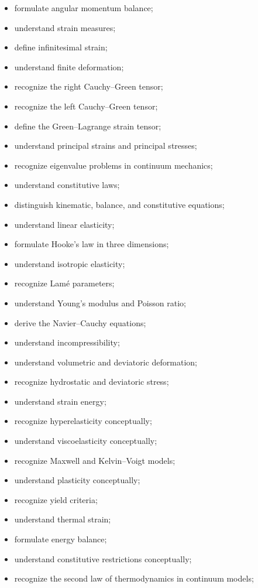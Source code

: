 {\begin{itemize}
    \item formulate angular momentum balance;
    \item understand strain measures;
    \item define infinitesimal strain;
    \item understand finite deformation;
    \item recognize the right Cauchy--Green tensor;
    \item recognize the left Cauchy--Green tensor;
    \item define the Green--Lagrange strain tensor;
    \item understand principal strains and principal stresses;
    \item recognize eigenvalue problems in continuum mechanics;
    \item understand constitutive laws;
    \item distinguish kinematic, balance, and constitutive equations;
    \item understand linear elasticity;
    \item formulate Hooke's law in three dimensions;
    \item understand isotropic elasticity;
    \item recognize Lamé parameters;
    \item understand Young's modulus and Poisson ratio;
    \item derive the Navier--Cauchy equations;
    \item understand incompressibility;
    \item understand volumetric and deviatoric deformation;
    \item recognize hydrostatic and deviatoric stress;
    \item understand strain energy;
    \item recognize hyperelasticity conceptually;
    \item understand viscoelasticity conceptually;
    \item recognize Maxwell and Kelvin--Voigt models;
    \item understand plasticity conceptually;
    \item recognize yield criteria;
    \item understand thermal strain;
    \item formulate energy balance;
    \item understand constitutive restrictions conceptually;
    \item recognize the second law of thermodynamics in continuum models;

\end{itemize}}
